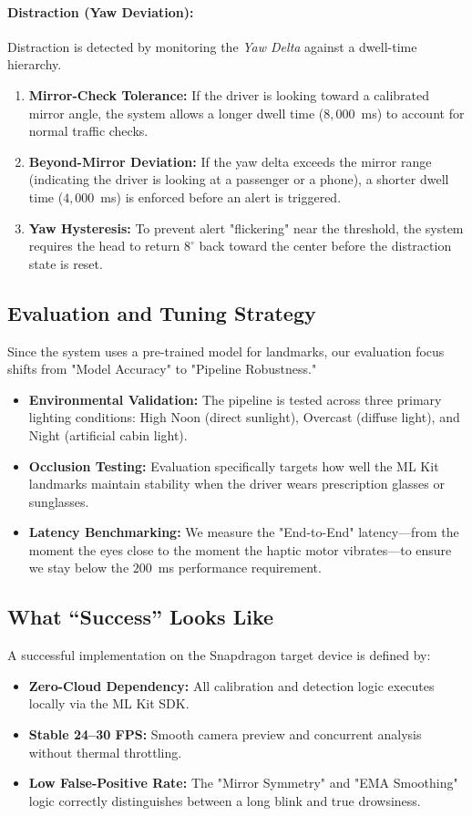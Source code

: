 \documentclass[11pt]{report}
\begin{document}
\paragraph{Distraction (Yaw Deviation):}
Distraction is detected by monitoring the \textit{Yaw Delta} against a dwell-time hierarchy.
\begin{enumerate}
    \item \textbf{Mirror-Check Tolerance:} If the driver is looking toward a calibrated mirror angle, the system allows a longer dwell time ($8,000$~ms) to account for normal traffic checks.
    \item \textbf{Beyond-Mirror Deviation:} If the yaw delta exceeds the mirror range (indicating the driver is looking at a passenger or a phone), a shorter dwell time ($4,000$~ms) is enforced before an alert is triggered.
    \item \textbf{Yaw Hysteresis:} To prevent alert "flickering" near the threshold, the system requires the head to return $8^\circ$ back toward the center before the distraction state is reset.
\end{enumerate}

\subsection{Evaluation and Tuning Strategy}
Since the system uses a pre-trained model for landmarks, our evaluation focus shifts from "Model Accuracy" to "Pipeline Robustness."

\begin{itemize}
    \item \textbf{Environmental Validation:} The pipeline is tested across three primary lighting conditions: High Noon (direct sunlight), Overcast (diffuse light), and Night (artificial cabin light).
    \item \textbf{Occlusion Testing:} Evaluation specifically targets how well the ML Kit landmarks maintain stability when the driver wears prescription glasses or sunglasses.
    \item \textbf{Latency Benchmarking:} We measure the "End-to-End" latency—from the moment the eyes close to the moment the haptic motor vibrates—to ensure we stay below the $200$~ms performance requirement.
\end{itemize}

\subsection{What ``Success'' Looks Like}
A successful implementation on the Snapdragon target device is defined by:
\begin{itemize}
    \item \textbf{Zero-Cloud Dependency:} All calibration and detection logic executes locally via the ML Kit SDK.
    \item \textbf{Stable 24--30 FPS:} Smooth camera preview and concurrent analysis without thermal throttling.
    \item \textbf{Low False-Positive Rate:} The "Mirror Symmetry" and "EMA Smoothing" logic correctly distinguishes between a long blink and true drowsiness.
\end{itemize}
\end{document}
